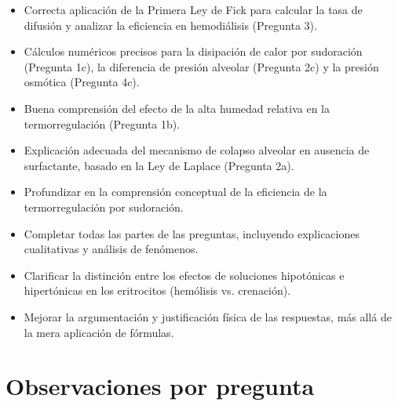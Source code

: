 \documentclass[11pt,a4paper]{article}
\begin{document}
\vspace{4pt}
\begin{minipage}[t]{0.48\linewidth}
  \begin{tcolorbox}[cajaFortaleza, title={Fortalezas}]
\begin{itemize}[leftmargin=1.5em, itemsep=2pt]
  \item Correcta aplicación de la Primera Ley de Fick para calcular la tasa de difusión y analizar la eficiencia en hemodiálisis (Pregunta 3).
  \item Cálculos numéricos precisos para la disipación de calor por sudoración (Pregunta 1c), la diferencia de presión alveolar (Pregunta 2c) y la presión osmótica (Pregunta 4c).
  \item Buena comprensión del efecto de la alta humedad relativa en la termorregulación (Pregunta 1b).
  \item Explicación adecuada del mecanismo de colapso alveolar en ausencia de surfactante, basado en la Ley de Laplace (Pregunta 2a).
\end{itemize}
  \end{tcolorbox}
\end{minipage}
\hfill
\begin{minipage}[t]{0.48\linewidth}
  \begin{tcolorbox}[cajaMejora, title={Areas de mejora}]
\begin{itemize}[leftmargin=1.5em, itemsep=2pt]
  \item Profundizar en la comprensión conceptual de la eficiencia de la termorregulación por sudoración.
  \item Completar todas las partes de las preguntas, incluyendo explicaciones cualitativas y análisis de fenómenos.
  \item Clarificar la distinción entre los efectos de soluciones hipotónicas e hipertónicas en los eritrocitos (hemólisis vs. crenación).
  \item Mejorar la argumentación y justificación física de las respuestas, más allá de la mera aplicación de fórmulas.
\end{itemize}
  \end{tcolorbox}
\end{minipage}

\section*{Observaciones por pregunta}
\end{document}
